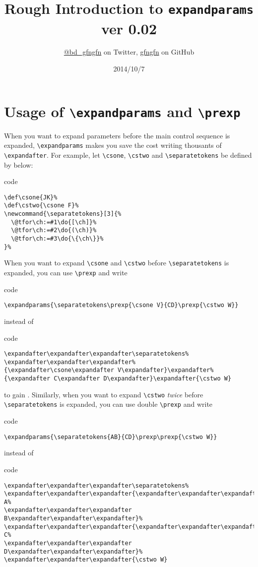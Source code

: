 \documentclass{jsarticle}
\title{Rough Introduction to \texttt{expandparams} ver 0.02}
\author{\url{@bd_gfngfn} on Twitter, \url{gfngfn} on GitHub}
\date{2014/10/7}
\makeatletter
\newcommand{\separatetokens}[3]{\@tfor\ch:=#1\do{[\ch]}\@tfor\ch:=#2\do{(\ch)}\@tfor\ch:=#3\do{\{\ch\}}}%
\def\csone{JK}%
\def\cstwo{\csone F}
\newcommand{\texcmd}[1]{\texttt{\textbackslash #1}}
\makeatother
\begin{document}
  \maketitle
  \section{Usage of \texcmd{expandparams} and \texcmd{prexp}}
  \indent When you want to expand parameters before the main control sequence is expanded,
    \texcmd{expandparams} makes you save the cost writing thousants of \texcmd{expandafter}.
    For example, let \texcmd{csone}, \texcmd{cstwo} and \texcmd{separatetokens} be defined by below:
\begin{itembox}{code}
\begin{verbatim}
\def\csone{JK}%
\def\cstwo{\csone F}%
\newcommand{\separatetokens}[3]{%
  \@tfor\ch:=#1\do{[\ch]}%
  \@tfor\ch:=#2\do{(\ch)}%
  \@tfor\ch:=#3\do{\{\ch\}}%
}%
\end{verbatim}
\end{itembox}
    When you want to expand \texcmd{csone} and \texcmd{cstwo} before \texcmd{separatetokens} is expanded,
    you can use \texcmd{prexp} and write
\begin{itembox}{code}
\begin{verbatim}
\expandparams{\separatetokens\prexp{\csone V}{CD}\prexp{\cstwo W}}
\end{verbatim}
\end{itembox}
    instead of
\begin{itembox}{code}
\begin{verbatim}
\expandafter\expandafter\expandafter\separatetokens%
\expandafter\expandafter\expandafter%
{\expandafter\csone\expandafter V\expandafter}\expandafter%
{\expandafter C\expandafter D\expandafter}\expandafter{\cstwo W}
\end{verbatim}
\end{itembox}
    to gain \expandparams{\separatetokens\prexp{\csone V}{CD}\prexp{\cstwo W}}.
    Similarly, when you want to expand \texcmd{cstwo} \textit{twice} before \texcmd{separatetokens} is expanded,
    you can use double \texcmd{prexp} and write
\begin{itembox}{code}
\begin{verbatim}
\expandparams{\separatetokens{AB}{CD}\prexp\prexp{\cstwo W}}
\end{verbatim}
\end{itembox}
    instead of
\begin{itembox}{code}
\begin{verbatim}
\expandafter\expandafter\expandafter\separatetokens%
\expandafter\expandafter\expandafter{\expandafter\expandafter\expandafter A%
\expandafter\expandafter\expandafter B\expandafter\expandafter\expandafter}%
\expandafter\expandafter\expandafter{\expandafter\expandafter\expandafter C%
\expandafter\expandafter\expandafter D\expandafter\expandafter\expandafter}%
\expandafter\expandafter\expandafter{\cstwo W}
\end{verbatim}
\end{itembox}
\end{document}
